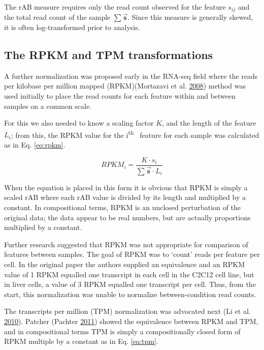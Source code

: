 \documentclass[onecolumn]{book}
\newcommand{\ith}[1]{ #1\textsuperscript{th}\ }
\newcommand{\vect}[1]{\vec{\textbf{#1}}}
\theoremstyle{definition}
\theoremstyle{definition}
\theoremstyle{definition}
\theoremstyle{remark}
\begin{document}
The rAB measure requires only the read count observed for the feature
\(s_{ij}\) and the total read count of the sample
\(\sum{\vec{\textbf{s}}}\). Since this measure is generally skewed, it
is often log-transformed prior to analysis.

\hypertarget{the-rpkm-and-tpm-transformations}{%
\subsection{The RPKM and TPM
transformations}\label{the-rpkm-and-tpm-transformations}}

A further normalization was proposed early in the RNA-seq field where
the reads per kilobase per million mapped (RPKM)(Mortazavi et al.
\protect\hyperlink{ref-Mortazavi:2008}{2008}) method was used initially
to place the read counts for each feature within and between samples on
a common scale.

For this we also needed to know a scaling factor \(K\), and the length
of the feature \(L_i\); from this, the RPKM value for the \ith{i}
feature for each sample was calculated as in Eq. \ref{eq:rpkm}.

\begin{equation}
    RPKM_{i} = \frac{K \cdot s_{i} }{\sum{\vect{s}} \cdot L_{i}}
    \label{eq:rpkm}
\end{equation}

When the equation is placed in this form it is obvious that RPKM is
simply a scaled rAB where each rAB value is divided by its length and
multiplied by a constant. In compositional terms, RPKM is an unclosed
perturbation of the original data; the data appear to be real numbers,
but are actually proportions multiplied by a constant.

Further research suggested that RPKM was not appropriate for comparison
of features between samples. The goal of RPKM was to `count' reads per
feature per cell. In the original paper the authors supplied an
equivalence and an RPKM value of 1 RPKM equalled one transcript in each
cell in the C2C12 cell line, but in liver cells, a value of 3 RPKM
equalled one transcript per cell. Thus, from the start, this
normalization was unable to normalize between-condition read counts.

The transcripts per million (TPM) normalization was advocated next (Li
et al. \protect\hyperlink{ref-Li:2010aa}{2010}). Patcher (Pachter
\protect\hyperlink{ref-Pachter:2011}{2011}) showed the equivalence
between RPKM and TPM, and in compositional terms TPM is simply a
compositionally closed form of RPKM multiple by a constant as in Eq.
\ref{eq:tpm}.
\end{document}

